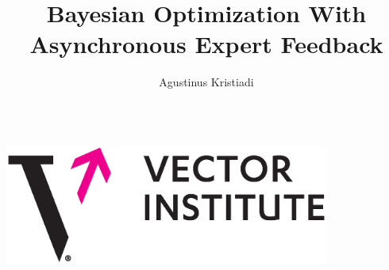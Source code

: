 \documentclass[11pt,usepdftitle=false,aspectratio=169,usenames,dvipsnames,handout]{beamer}
\begin{document}
\begin{frame}

  \vspace{3em}
  \title{\LARGE \bf Bayesian Optimization With Asynchronous Expert Feedback}
  \author{\color{Vmagenta} Agustinus Kristiadi}
  \date{}

  \maketitle




  \begin{columns}
    \centering
    \includegraphics[width=0.8\textwidth]{assets/vector_horizontal}



  \end{columns}

  \thispagestyle{empty}
  \setcounter{framenumber}{0}
\end{frame}
\end{document}
